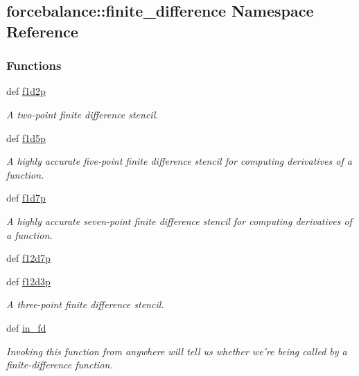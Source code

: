\hypertarget{namespaceforcebalance_1_1finite__difference}{\subsection{forcebalance\-:\-:finite\-\_\-difference \-Namespace \-Reference}
\label{namespaceforcebalance_1_1finite__difference}
}
\subsubsection*{\-Functions}
\begin{DoxyCompactItemize}
\item 
def \hyperlink{namespaceforcebalance_1_1finite__difference_ac5bb1552a9b8dd22c9c80e6444de2218}{f1d2p}
\begin{DoxyCompactList}\small\item\em \-A two-\/point finite difference stencil. \end{DoxyCompactList}\item 
def \hyperlink{namespaceforcebalance_1_1finite__difference_a123c5d5dea0f3f50ab57796bb3bc39be}{f1d5p}
\begin{DoxyCompactList}\small\item\em \-A highly accurate five-\/point finite difference stencil for computing derivatives of a function. \end{DoxyCompactList}\item 
def \hyperlink{namespaceforcebalance_1_1finite__difference_a9be9f0d21300958092e380514e2e980d}{f1d7p}
\begin{DoxyCompactList}\small\item\em \-A highly accurate seven-\/point finite difference stencil for computing derivatives of a function. \end{DoxyCompactList}\item 
def \hyperlink{namespaceforcebalance_1_1finite__difference_acc281f85b668062745f711d9b4a610fa}{f12d7p}
\item 
def \hyperlink{namespaceforcebalance_1_1finite__difference_aa69a8819e4680091f400303c1d6ddeb7}{f12d3p}
\begin{DoxyCompactList}\small\item\em \-A three-\/point finite difference stencil. \end{DoxyCompactList}\item 
def \hyperlink{namespaceforcebalance_1_1finite__difference_ad84d3e385db1190e7d8ef58bc08a6c52}{in\-\_\-fd}
\begin{DoxyCompactList}\small\item\em \-Invoking this function from anywhere will tell us whether we're being called by a finite-\/difference function. \end{DoxyCompactList}\item 

\end{DoxyCompactItemize}

